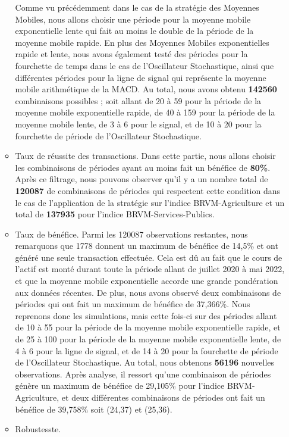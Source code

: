 \begin{itemize}
\begin{itemize}
    { Comme vu précédemment dans le cas de la stratégie des Moyennes
    Mobiles, nous allons choisir une période pour la moyenne mobile
    exponentielle lente qui fait au moins le double de la période de la
    moyenne mobile rapide. En plus des Moyennes Mobiles exponentielles
    rapide et lente, nous avons également testé des périodes pour la
    fourchette de temps dans le cas de l'Oscillateur Stochastique, ainsi
    que différentes périodes pour la ligne de signal qui représente la
    moyenne mobile arithmétique de la MACD. Au total, nous avons obtenu
    \textbf{142560} combinaisons possibles ; soit allant de 20 à 59 pour
    la période de la moyenne mobile exponentielle rapide, de 40 à 159
    pour la période de la moyenne mobile lente, de 3 à 6 pour le signal,
    et de 10 à 20 pour la fourchette de période de l'Oscillateur
    Stochastique. }
  \item
    Taux de réussite des transactions. Dans cette partie, nous allons
    choisir les combinaisons de périodes ayant au moins fait un bénéfice
    de \textbf{80\%}. Après ce filtrage, nous pouvons observer qu'il y a
    un nombre total de \textbf{120087} de combinaisons de périodes qui
    respectent cette condition dans le cas de l'application de la
    stratégie sur l'indice BRVM-Agriculture et un total de
    \textbf{137935} pour l'indice BRVM-Services-Publics.
  \item
    Taux de bénéfice. Parmi les 120087 observations restantes, nous
    remarquons que 1778 donnent un maximum de bénéfice de 14,5\% et ont
    généré une seule transaction effectuée. Cela est dû au fait que le
    cours de l'actif est monté durant toute la période allant de juillet
    2020 à mai 2022, et que la moyenne mobile exponentielle accorde une
    grande pondération aux données récentes. De plus, nous avons observé
    deux combinaisons de périodes qui ont fait un maximum de bénéfice de
    37,366\%. Nous reprenons donc les simulations, mais cette fois-ci
    sur des périodes allant de 10 à 55 pour la période de la moyenne
    mobile exponentielle rapide, et de 25 à 100 pour la période de la
    moyenne mobile exponentielle lente, de 4 à 6 pour la ligne de
    signal, et de 14 à 20 pour la fourchette de période de l'Oscillateur
    Stochastique. Au total, nous obtenons \textbf{56196} nouvelles
    observations. Après analyse, il ressort qu'une combinaison de
    périodes génère un maximum de bénéfice de 29,105\% pour l'indice
    BRVM-Agriculture, et deux différentes combinaisons de périodes ont
    fait un bénéfice de 39,758\% soit (24,37) et (25,36).
  \item
    Robustesste.


\end{itemize}
\end{itemize}
